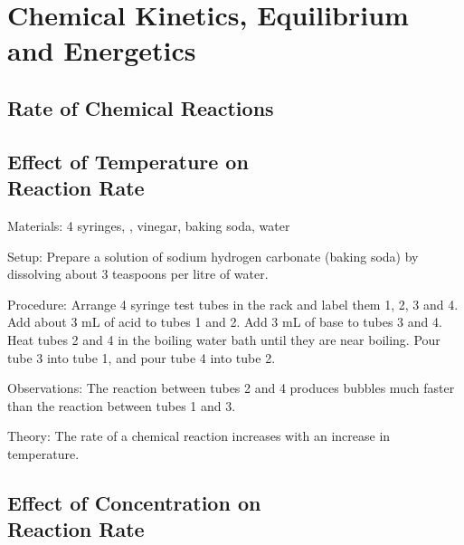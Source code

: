 \section{Chemical Kinetics, Equilibrium and Energetics}

\begin{multicols}{2}


\section*{Rate of Chemical Reactions}


\subsection{Effect of Temperature on \hfill \\ Reaction Rate}


\begin{description*}
\item[Materials:]{4 syringes, , vinegar, baking soda, water }
\item[Setup:]{Prepare a solution of sodium hydrogen carbonate (baking soda) by dissolving about 3 teaspoons per litre of water.}
\item[Procedure:]{Arrange 4 syringe test tubes in the rack and label them 1, 2, 3 and 4. Add about 3 mL of acid to tubes 1 and 2. Add 3 mL of base to tubes 3 and 4. Heat tubes 2 and 4 in the boiling water bath until they are near boiling. Pour tube 3 into tube 1, and pour tube 4 into tube 2.}
\item[Observations:]{The reaction between tubes 2 and 4 produces bubbles much faster than the reaction between tubes 1 and 3.}
\item[Theory:]{The rate of a chemical reaction increases with an increase in temperature.}
\end{description*}

\subsection{Effect of Concentration on \hfill \\ Reaction Rate} %


\end{multicols}
